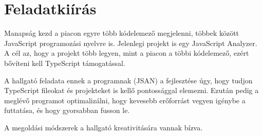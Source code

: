\chapter*{Feladatkiírás}

\noindent

Manapság kezd a piacon egyre több kódelemező megjelenni, többek között JavaScript programozási nyelvre is. Jelenlegi projekt is egy JavaScript Analyzer. 
A cél az, hogy a projekt több legyen, mint a piacon a többi kódelemező, ezért bővíteni kell TypeScript támogatással.

\noindent

A hallgató feladata ennek a programnak (JSAN) a fejlesztése úgy, hogy tudjon TypeScript fileokat és projekteket is kellő pontossággal elemezni. 
Ezután pedig a meglévő programot optimalizálni, hogy kevesebb erőforrást vegyen igénybe a futtatása, és hogy gyorsabban fusson le.

\noindent

A megoldási módszerek a hallgató kreativitására vannak bízva.
